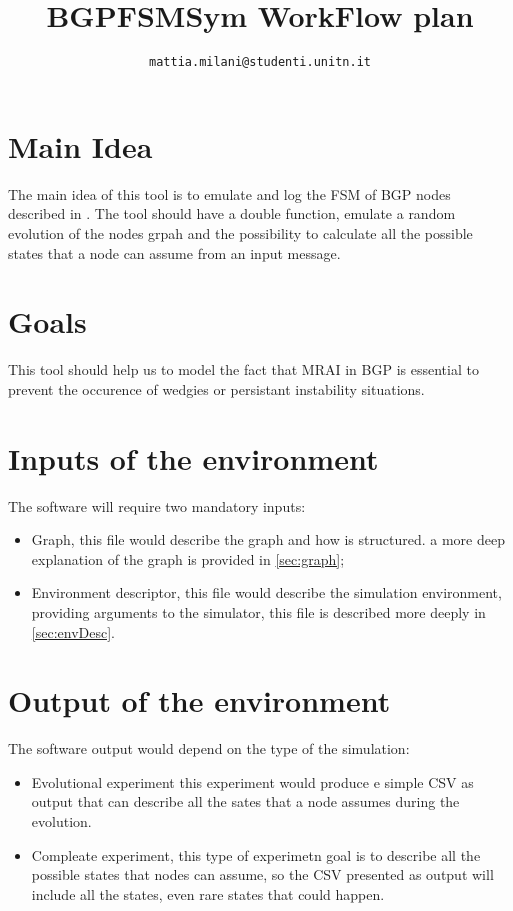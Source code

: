 \documentclass[10pt,conference,letterpaper]{IEEEtran}
\begin{document}
\title{BGPFSMSym WorkFlow plan}
\author{
    \texttt{mattia.milani@studenti.unitn.it}
}


\maketitle

\section{Main Idea}
\label{sec:mainIdea}
The main idea of this tool is to emulate and log the FSM of BGP nodes described
in \cite{griffinFSM}.
The tool should have a double function, emulate a random evolution of the nodes
grpah and the possibility to calculate all the possible states that a node can
assume from an input message.

\section{Goals}
\label{sec:goals}
This tool should help us to model the fact that \ac{MRAI} in \ac{BGP} is essential
to prevent the occurence of wedgies  or persistant 
instability situations.

\section{Inputs of the environment}
\label{sec:input}
The software will require two mandatory inputs:
\begin{itemize}
		\item Graph, this file would describe the graph and how is structured.
			a more deep explanation of the graph is provided in \cref{sec:graph};
		\item Environment descriptor, this file would describe the simulation
			environment, providing arguments to the simulator, this file is
			described more deeply in \cref{sec:envDesc}.
\end{itemize}

\section{Output of the environment}
The software output would depend on the type of the simulation:
\begin{itemize}
		\item Evolutional experiment this experiment would produce e simple CSV
			as output that can describe all the sates that a node assumes during
			the evolution.
		\item Compleate experiment, this type of experimetn goal is to describe
			all the possible states that nodes can assume, so the CSV presented
			as output will include all the states, even rare states that could
			happen.
\end{itemize}
\end{document}
